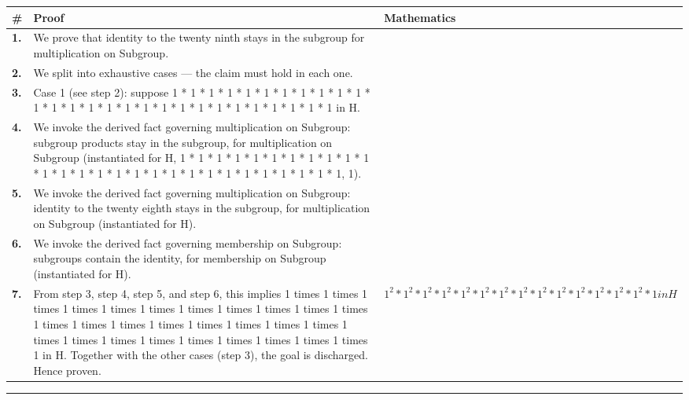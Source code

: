 \documentclass[11pt]{article}
\theoremstyle{definition}
\begin{document}
\begin{tabular}{@{} >{\raggedright\arraybackslash}p{} >{\raggedright\arraybackslash}p{} >{\raggedleft\arraybackslash}p{} @{}}
\textbf{\#} & \textbf{Proof} & \textbf{Mathematics} \\
\midrule
\textbf{1.} & We prove that identity to the twenty ninth stays in the subgroup for multiplication on Subgroup. & \\[0.45em]
\textbf{2.} & We split into exhaustive cases — the claim must hold in each one. & \\[0.45em]
\textbf{3.} & Case 1 (see step 2): suppose 1 * 1 * 1 * 1 * 1 * 1 * 1 * 1 * 1 * 1 * 1 * 1 * 1 * 1 * 1 * 1 * 1 * 1 * 1 * 1 * 1 * 1 * 1 * 1 * 1 * 1 * 1 * 1 in H. & \\[0.45em]
\textbf{4.} & We invoke the derived fact governing multiplication on Subgroup: subgroup products stay in the subgroup, for multiplication on Subgroup (instantiated for H, 1 * 1 * 1 * 1 * 1 * 1 * 1 * 1 * 1 * 1 * 1 * 1 * 1 * 1 * 1 * 1 * 1 * 1 * 1 * 1 * 1 * 1 * 1 * 1 * 1 * 1 * 1 * 1, 1). & \\[0.45em]
\textbf{5.} & We invoke the derived fact governing multiplication on Subgroup: identity to the twenty eighth stays in the subgroup, for multiplication on Subgroup (instantiated for H). & \\[0.45em]
\textbf{6.} & We invoke the derived fact governing membership on Subgroup: subgroups contain the identity, for membership on Subgroup (instantiated for H). & \\[0.45em]
\textbf{7.} & From step 3, step 4, step 5, and step 6, this implies 1 times 1 times 1 times 1 times 1 times 1 times 1 times 1 times 1 times 1 times 1 times 1 times 1 times 1 times 1 times 1 times 1 times 1 times 1 times 1 times 1 times 1 times 1 times 1 times 1 times 1 times 1 times 1 times 1 in H. Together with the other cases (step 3), the goal is discharged. Hence proven. & $\displaystyle 1^{2} * 1^{2} * 1^{2} * 1^{2} * 1^{2} * 1^{2} * 1^{2} * 1^{2} * 1^{2} * 1^{2} * 1^{2} * 1^{2} * 1^{2} * 1^{2} * 1 in H$ \\[0.45em]
\bottomrule
\end{tabular}
\label{thm:Subgroup-multiplication-identity_to_the_twenty_ninth_stays_in_the_subgroup}
\par\medskip\hrule
\end{document}
